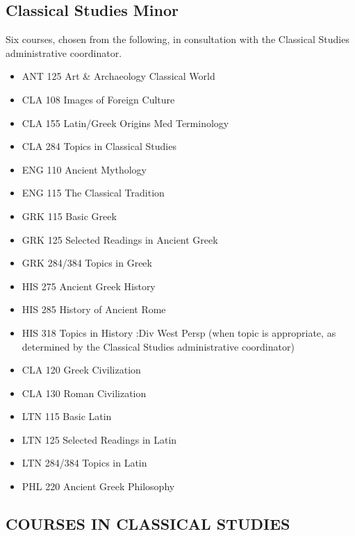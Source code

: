 \documentclass[
  letterpaper,
]{scrbook}
\providecommand{\tightlist}{%
  \setlength{\itemsep}{0pt}\setlength{\parskip}{0pt}}
\begin{document}
\subsection{Classical Studies Minor}\label{classical-studies-minor}

Six courses, chosen from the following, in consultation with the
Classical Studies administrative coordinator.

\begin{itemize}
\tightlist
\item
  ANT 125 Art \& Archaeology Classical World
\item
  CLA 108 Images of Foreign Culture
\item
  CLA 155 Latin/Greek Origins Med Terminology
\item
  CLA 284 Topics in Classical Studies
\item
  ENG 110 Ancient Mythology
\item
  ENG 115 The Classical Tradition
\item
  GRK 115 Basic Greek
\item
  GRK 125 Selected Readings in Ancient Greek
\item
  GRK 284/384 Topics in Greek
\item
  HIS 275 Ancient Greek History
\item
  HIS 285 History of Ancient Rome
\item
  HIS 318 Topics in History :Div West Persp (when topic is appropriate,
  as determined by the Classical Studies administrative coordinator)
\item
  CLA 120 Greek Civilization
\item
  CLA 130 Roman Civilization
\item
  LTN 115 Basic Latin
\item
  LTN 125 Selected Readings in Latin
\item
  LTN 284/384 Topics in Latin
\item
  PHL 220 Ancient Greek Philosophy
\end{itemize}

\subsection{COURSES IN CLASSICAL
STUDIES}\label{courses-in-classical-studies}
\end{document}
